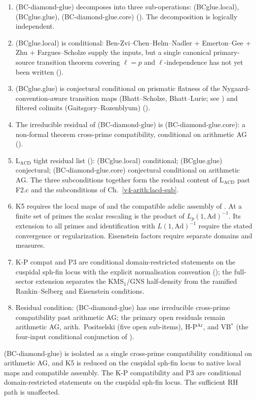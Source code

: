 \begin{enumerate}
\item (BC-diamond-glue) decomposes into three sub-operations:
(BCglue.local), (BCglue.glue), (BC-diamond-glue.core)
(). The decomposition
is logically independent.
\item (BCglue.local) is conditional: Ben-Zvi--Chen--Helm--Nadler +
Emerton--Gee + Zhu + Fargues--Scholze supply the inputs, but a single
canonical primary-source transition theorem covering \(\ell = p\) and
\(\ell\)-independence has not yet been written
().
\item (BCglue.glue) is conjectural conditional on prismatic flatness
of the Nygaard-convention-aware transition maps
(Bhatt--Scholze, Bhatt--Lurie; see
) and filtered
colimits (Gaitsgory--Rozenblyum)
().
\item The irreducible residual of (BC-diamond-glue) is
(BC-diamond-glue.core): a non-formal theorem cross-prime compatibility,
conditional on arithmetic AG
().
\item \(\mathrm{L}_{\mathrm{ACD}}\) tight residual list
(): (BCglue.local)
conditional; (BCglue.glue) conjectural; (BC-diamond-glue.core)
conjectural conditional on arithmetic AG. The three subconditions
together form the residual content of \(\mathrm{L}_{\mathrm{ACD}}\)
past F2.c and the subconditions of
Ch.~\ref{v4-arith:lacd-sub}.
\item K5 requires the local maps of
 and the
compatible adelic assembly of
.
At a finite set of primes the scalar rescaling is the product of
\(L_p(1,\mathrm{Ad})^{-1}\). Its extension to all primes and
identification with \(L(1,\mathrm{Ad})^{-1}\) require the
stated convergence or regularization. Eisenstein factors require
separate domains and measures.
\item K-P compat and P3 are conditional domain-restricted statements
on the cuspidal sph-fin locus with the explicit normalisation convention
();
the full-sector extension separates the KMS\(_{1}\)/GNS half-density
from the ramified Rankin--Selberg and Eisenstein conditions.
\item Residual condition: (BC-diamond-glue) has one irreducible
cross-prime compatibility past arithmetic AG; the primary open
residuals remain arithmetic AG, arith.~Positselski (five open
sub-items), H-P\(^{\mathrm{Ar}}\), and VB\(^{*}\) (the
four-input conditional conjunction of
).
\end{enumerate}

(BC-diamond-glue) is isolated as a single cross-prime compatibility
conditional on arithmetic AG, and K5 is reduced on the cuspidal
sph-fin locus to native local maps and compatible assembly. The K-P compatibility
and P3 are conditional domain-restricted statements on the cuspidal
sph-fin locus. The sufficient RH path is unaffected.
